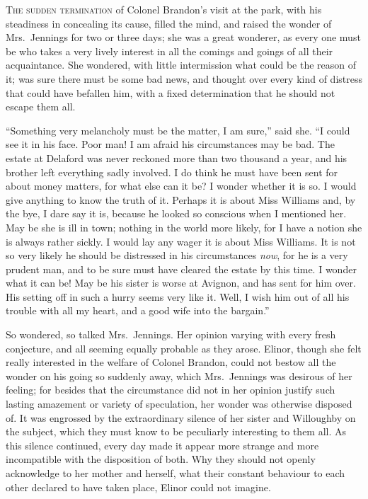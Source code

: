 \documentclass{article}
\newcommand{\gintro}[1]{\textcolor{gcolor}{\textsc{#1}}}
\begin{document}
\gintro{The sudden termination} of Colonel Brandon's visit
at the park, with his steadiness in concealing its cause,
filled the mind, and raised the wonder of Mrs.\ Jennings
for two or three days; she was a great wonderer, as every
one must be who takes a very lively interest in all the
comings and goings of all their acquaintance.  She wondered,
with little intermission what could be the reason of it;
was sure there must be some bad news, and thought over
every kind of distress that could have befallen him,
with a fixed determination that he should not escape
them all.

``Something very melancholy must be the matter,
I am sure,'' said she.  ``I could see it in his face.
Poor man!  I am afraid his circumstances may be bad.
The estate at Delaford was never reckoned more than two thousand
a year, and his brother left everything sadly involved.
I do think he must have been sent for about money matters,
for what else can it be?  I wonder whether it is so.
I would give anything to know the truth of it.  Perhaps it
is about Miss Williams and, by the bye, I dare say it is,
because he looked so conscious when I mentioned her.
May be she is ill in town; nothing in the world more likely,
for I have a notion she is always rather sickly.
I would lay any wager it is about Miss Williams.
It is not so very likely he should be distressed in
his circumstances \emph{now}, for he is a very prudent man,
and to be sure must have cleared the estate by this time.
I wonder what it can be!  May be his sister is worse
at Avignon, and has sent for him over.  His setting off
in such a hurry seems very like it.  Well, I wish him out
of all his trouble with all my heart, and a good wife into
the bargain.''

So wondered, so talked Mrs.\ Jennings.  Her opinion
varying with every fresh conjecture, and all seeming
equally probable as they arose.  Elinor, though she felt
really interested in the welfare of Colonel Brandon,
could not bestow all the wonder on his going so suddenly
away, which Mrs.\ Jennings was desirous of her feeling;
for besides that the circumstance did not in her opinion
justify such lasting amazement or variety of speculation,
her wonder was otherwise disposed of.  It was engrossed
by the extraordinary silence of her sister and Willoughby
on the subject, which they must know to be peculiarly
interesting to them all.  As this silence continued,
every day made it appear more strange and more incompatible
with the disposition of both.  Why they should not openly
acknowledge to her mother and herself, what their constant
behaviour to each other declared to have taken place,
Elinor could not imagine.
\end{document}
